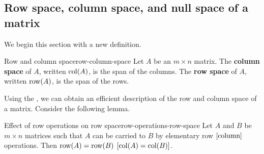 \subsection{Row space, column space, and null space of a matrix}

We begin this section with a new definition.

\begin{definition}{Row and column space}{row-column-space}
Let $A$ be an $m\times n$ matrix. The \textbf{column space} of $A$, written $\mbox{\rm col}(A)$, is the
span of the columns. The \textbf{row space} of $A$, written $\mbox{\rm row}(A)$, is the span of the rows.
\end{definition}

Using the {\rref}, we can obtain an efficient description of the row and column space of
a matrix. Consider the following lemma.

\begin{lemma}{Effect of row operations on row space}{row-operations-row-space}
Let $A$ and $B$ be $m\times n$ matrices such that $A$ can be carried to $B$ by elementary row $\left[\mbox{column}\right]$ operations. Then $\mbox{\rm row}(A)=\mbox{\rm row}(B)$ $\left[\mbox{\rm col}(A)=\mbox{\rm col}(B)\right]$.
\end{lemma}

